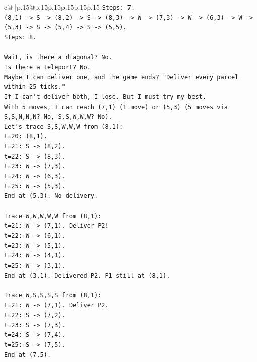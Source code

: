 \documentclass{article}
\begin{document}
{\begin{supertabular}{c@{$\;$}|p{.15\linewidth}@{}p{.15\linewidth}p{.15\linewidth}p{.15\linewidth}p{.15\linewidth}p{.15\linewidth}}
{{{\texttt{Steps: 7.} \\
\texttt{(8,1) {-}> S {-}> (8,2) {-}> S {-}> (8,3) {-}> W {-}> (7,3) {-}> W {-}> (6,3) {-}> W {-}> (5,3) {-}> S {-}> (5,4) {-}> S {-}> (5,5).} \\
\texttt{Steps: 8.} \\
\\ 
\texttt{Wait, is there a diagonal? No.} \\
\texttt{Is there a teleport? No.} \\
\texttt{Maybe I can deliver one, and the game ends? "Deliver every parcel within 25 ticks."} \\
\texttt{If I can't deliver both, I lose. But I must try my best.} \\
\texttt{With 5 moves, I can reach (7,1) (1 move) or (5,3) (5 moves via S,S,N,N,N? No, S,S,W,W,W? No).} \\
\texttt{Let's trace S,S,W,W,W from (8,1):} \\
\texttt{t=20: (8,1).} \\
\texttt{t=21: S {-}> (8,2).} \\
\texttt{t=22: S {-}> (8,3).} \\
\texttt{t=23: W {-}> (7,3).} \\
\texttt{t=24: W {-}> (6,3).} \\
\texttt{t=25: W {-}> (5,3).} \\
\texttt{End at (5,3). No delivery.} \\
\\ 
\texttt{Trace W,W,W,W,W from (8,1):} \\
\texttt{t=21: W {-}> (7,1). Deliver P2!} \\
\texttt{t=22: W {-}> (6,1).} \\
\texttt{t=23: W {-}> (5,1).} \\
\texttt{t=24: W {-}> (4,1).} \\
\texttt{t=25: W {-}> (3,1).} \\
\texttt{End at (3,1). Delivered P2. P1 still at (8,1).} \\
\\ 
\texttt{Trace W,S,S,S,S from (8,1):} \\
\texttt{t=21: W {-}> (7,1). Deliver P2.} \\
\texttt{t=22: S {-}> (7,2).} \\
\texttt{t=23: S {-}> (7,3).} \\
\texttt{t=24: S {-}> (7,4).} \\
\texttt{t=25: S {-}> (7,5).} \\
\texttt{End at (7,5).} \\
}}}
\end{supertabular}}
\end{document}
